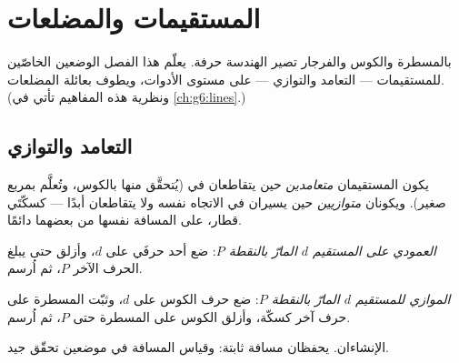\chapter{المستقيمات والمضلعات}\label{ch:g4:geometry}

بالمسطرة والكوس والفرجار تصير الهندسة حرفة. يعلّم هذا الفصل
الوضعين الخاصّين للمستقيمات --- التعامد والتوازي --- على مستوى
الأدوات، ويطوف بعائلة المضلعات. (ونظرية هذه المفاهيم تأتي في
\cref{ch:g6:lines}.)

\section{التعامد والتوازي}

\begin{definition}\label{def:g4:geometry:def}
يكون المستقيمان \emph{متعامدين} حين
يتقاطعان في  (يُتحقَّق منها بالكوس، وتُعلَّم بمربع
صغير). ويكونان \emph{متوازيين} حين
يسيران في الاتجاه نفسه ولا يتقاطعان أبدًا --- كسكّتَي قطار،
على المسافة نفسها من بعضهما دائمًا.
\end{definition}

\begin{method}\label{met:g4:geometry:draw}
\emph{العمودي على المستقيم $d$ المارّ بالنقطة $P$}: ضع أحد
حرفَي  على $d$، وأزلق حتى يبلغ الحرف الآخر $P$،
ثم اُرسم.

\emph{الموازي للمستقيم $d$ المارّ بالنقطة $P$}: ضع حرف الكوس
على $d$، وثبّت المسطرة على حرف آخر كسكّة، وأزلق الكوس على
المسطرة حتى $P$، ثم اُرسم.
\end{method}

\begin{omfigure}

{\small الإنشاءان.  يحفظان مسافة ثابتة:
وقياس المسافة في موضعين تحقّق جيد.}
\end{omfigure}

